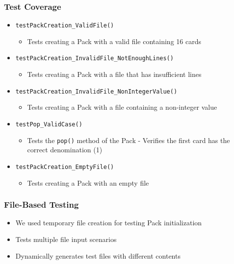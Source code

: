 \documentclass{article}
\begin{document}
\subsubsection{Test Coverage}
\begin{itemize}
    \item \texttt{testPackCreation\_ValidFile()}
          \begin{itemize}
              \item Tests creating a Pack with a valid file containing 16 cards
          \end{itemize}
    \item \texttt{testPackCreation\_InvalidFile\_NotEnoughLines()}
          \begin{itemize}
              \item Tests creating a Pack with a file that has insufficient lines
          \end{itemize}
    \item \texttt{testPackCreation\_InvalidFile\_NonIntegerValue()}
          \begin{itemize}
              \item Tests creating a Pack with a file containing a non-integer value
          \end{itemize}
    \item \texttt{testPop\_ValidCase()}
          \begin{itemize}
              \item Tests the \texttt{pop()} method of the Pack - Verifies the first card has the correct denomination (1)
          \end{itemize}
    \item \texttt{testPackCreation\_EmptyFile()}
          \begin{itemize}
              \item Tests creating a Pack with an empty file
          \end{itemize}
\end{itemize}

\subsubsection{File-Based Testing}
\begin{itemize}
    \item We used temporary file creation for testing Pack initialization
    \item Tests multiple file input scenarios
    \item Dynamically generates test files with different contents
\end{itemize}
\end{document}
